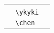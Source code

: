\documentclass[uplatex, dvipdfmx, a4paper, 12pt, class=jsarticle, crop=false]{standalone}
\begin{document}
\begin{table}[htb]
\begin{tabular}{ll@{\qquad}l}
		\tablesubtitle{その他} \\
		\ykyki & \verb|\ykyki| &  \\
		\chen  & \verb|\chen|  &  \\
		\hline

		\hline
	\end{tabular}
\end{table}
\end{document}
